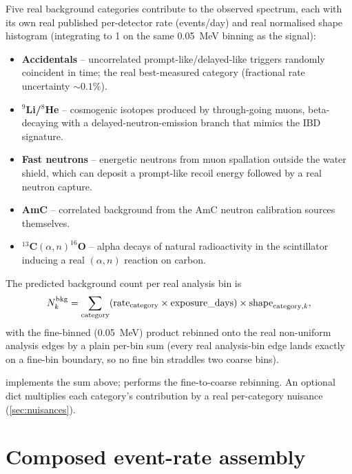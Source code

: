 \begin{theorybox}
Five real background categories contribute to the observed spectrum,
each with its own real published per-detector rate (events/day) and real
normalised shape histogram (integrating to 1 on the same 0.05~MeV binning
as the signal):
\begin{itemize}
  \item \textbf{Accidentals} -- uncorrelated prompt-like/delayed-like
    triggers randomly coincident in time; the real best-measured category
    (fractional rate uncertainty $\sim0.1\%$).
  \item \textbf{$^9$Li/$^8$He} -- cosmogenic isotopes produced by
    through-going muons, beta-decaying with a delayed-neutron-emission
    branch that mimics the IBD signature.
  \item \textbf{Fast neutrons} -- energetic neutrons from muon spallation
    outside the water shield, which can deposit a prompt-like recoil energy
    followed by a real neutron capture.
  \item \textbf{AmC} -- correlated background from the AmC neutron
    calibration sources themselves.
  \item \textbf{$^{13}$C$(\alpha,n)^{16}$O} -- alpha decays of natural
    radioactivity in the scintillator inducing a real $(\alpha,n)$ reaction
    on carbon.
\end{itemize}
The predicted background count per real analysis bin is
\begin{equation}
  N_k^{\rm bkg} = \sum_{\rm category} ({\rm rate}_{\rm category}\times{\rm exposure\_days})
    \times{\rm shape}_{{\rm category},k},
\end{equation}
with the fine-binned (0.05~MeV) product rebinned onto the real
non-uniform analysis edges by a plain per-bin sum (every real analysis-bin
edge lands exactly on a fine-bin boundary, so no fine bin straddles two
coarse bins).
\end{theorybox}

\begin{implbox}
 implements the sum above;
 performs the fine-to-coarse rebinning.
An optional  dict multiplies each category's
contribution by a real per-category nuisance (\cref{sec:nuisances}).
\end{implbox}

\section{Composed event-rate assembly}
\label{sec:event-rate-assembly}

